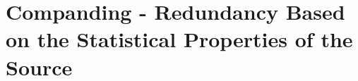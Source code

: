 \chapter{Companding - Redundancy Based on the Statistical Properties of the Source}
\label{ch:part1}